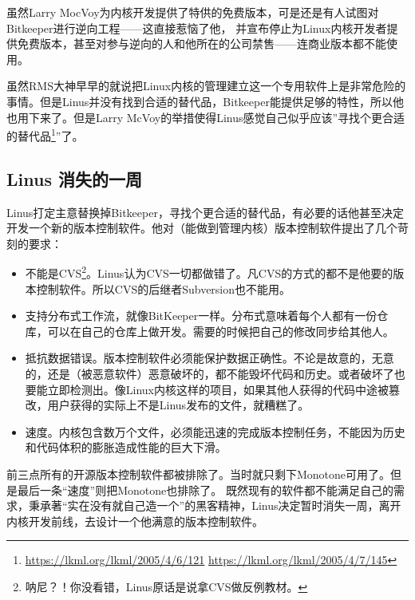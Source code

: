 虽然Larry MocVoy为内核开发提供了特供的免费版本，可是还是有人试图对Bitkeeper进行逆向工程——这直接惹恼了他，
并宣布停止为Linux内核开发者提供免费版本，甚至对参与逆向的人和他所在的公司禁售——连商业版本都不能使用。

虽然RMS大神早早的就说把Linux内核的管理建立这一个专用软件上是非常危险的事情。但是Linus并没有找到合适的替代品，Bitkeeper能提供足够的特性，所以他也用下来了。但是Larry McVoy的举措使得Linus感觉自己似乎应该”寻找个更合适的替代品\footnote{\url{https://lkml.org/lkml/2005/4/6/121} \url{https://lkml.org/lkml/2005/4/7/145}}”了。

\subsection{Linus 消失的一周}

Linus打定主意替换掉Bitkeeper，寻找个更合适的替代品，有必要的话他甚至决定开发一个新的版本控制软件。他对（能做到管理内核）版本控制软件提出了几个苛刻的要求：

\begin{itemize}
\item 不能是CVS\footnote{呐尼？！你没看错，Linus原话是说拿CVS做反例教材。}。Linus认为CVS一切都做错了。凡CVS的方式的都不是他要的版本控制软件。所以CVS的后继者Subversion也不能用。
\item 支持分布式工作流，就像BitKeeper一样。分布式意味着每个人都有一份仓库，可以在自己的仓库上做开发。需要的时候把自己的修改同步给其他人。

\item 抵抗数据错误。版本控制软件必须能保护数据正确性。不论是故意的，无意的，还是（被恶意软件）恶意破坏的，都不能毁坏代码和历史。或者破坏了也要能立即检测出。像Linux内核这样的项目，如果其他人获得的代码中途被篡改，用户获得的实际上不是Linus发布的文件，就糟糕了。

\item 速度。内核包含数万个文件，必须能迅速的完成版本控制任务，不能因为历史和代码体积的膨胀造成性能的巨大下滑。

\end{itemize}

前三点所有的开源版本控制软件都被排除了。当时就只剩下Monotone可用了。但是最后一条“速度”则把Monotone也排除了。
既然现有的软件都不能满足自己的需求，秉承著“实在没有就自己造一个”的黑客精神，Linus决定暂时消失一周，离开内核开发前线，去设计一个他满意的版本控制软件。

